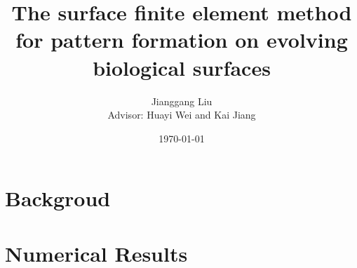 \documentclass[notheorems,serif]{beamer}
\begin{document}
\title[]{The surface finite element method for pattern formation on evolving biological surfaces}
\author[M. Liu]{Jianggang Liu\\
\medskip
Advisor: Huayi Wei and Kai Jiang}
\date{\today}

%

\frame[plain]{\titlepage}





\section{Backgroud}


\section{Numerical Results}
\end{document}
